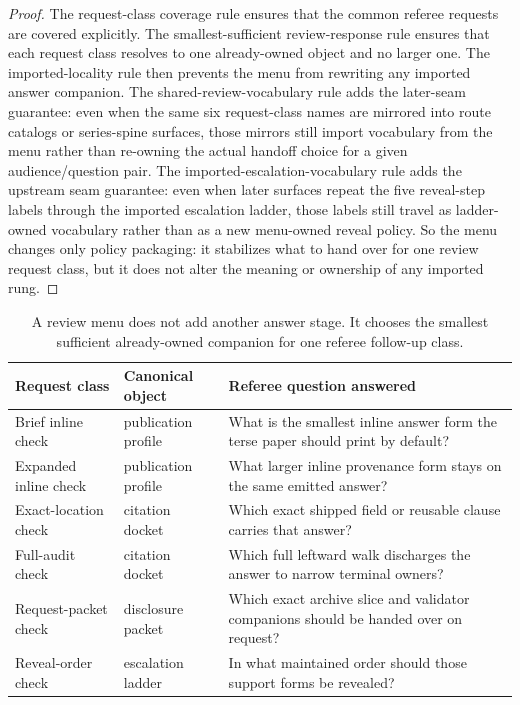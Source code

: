 \documentclass[11pt]{article}
\begin{document}
\begin{proof}
The request-class coverage rule ensures that the common referee requests are covered explicitly.
The smallest-sufficient review-response rule ensures that each request class resolves to one already-owned object and no larger one.
The imported-locality rule then prevents the menu from rewriting any imported answer companion. The shared-review-vocabulary rule adds the later-seam guarantee: even when the same six request-class names are mirrored into route catalogs or series-spine surfaces, those mirrors still import vocabulary from the menu rather than re-owning the actual handoff choice for a given audience/question pair. The imported-escalation-vocabulary rule adds the upstream seam guarantee: even when later surfaces repeat the five reveal-step labels through the imported escalation ladder, those labels still travel as ladder-owned vocabulary rather than as a new menu-owned reveal policy.
So the menu changes only policy packaging: it stabilizes what to hand over for one review request class, but it does not alter the meaning or ownership of any imported rung.\qedhere
\end{proof}

\begin{table}[t]
\centering
\small
\begin{tabularx}{\linewidth}{@{}l l X@{}}
\toprule
Request class & Canonical object & Referee question answered \\
\midrule
Brief inline check & publication profile & What is the smallest inline answer form the terse paper should print by default? \\
Expanded inline check & publication profile & What larger inline provenance form stays on the same emitted answer? \\
Exact-location check & citation docket & Which exact shipped field or reusable clause carries that answer? \\
Full-audit check & citation docket & Which full leftward walk discharges the answer to narrow terminal owners? \\
Request-packet check & disclosure packet & Which exact archive slice and validator companions should be handed over on request? \\
Reveal-order check & escalation ladder & In what maintained order should those support forms be revealed? \\
\bottomrule
\end{tabularx}
\caption{A review menu does not add another answer stage. It chooses the smallest sufficient already-owned companion for one referee follow-up class.}
\label{tab:answerreviewmenu}
\end{table}
\end{document}
